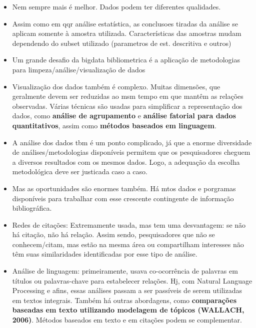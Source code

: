 \documentclass[11pt]{article}
\begin{document}
\begin{itemize}
\item Nem sempre mais é melhor. Dados podem ter diferentes qualidades.

\item Assim como em qqr análise estatística, as conclusoes tiradas da análise se aplicam somente à amostra utilizada. Características das amostras mudam dependendo do subset utilizado (parametros de est. descritiva e outros)

\item Um grande desafio da bigdata bibliometrica é a aplicação de metodologias para limpeza/análise/visualização de dados

\item Visualização dos dados também é complexo. Muitas dimensões, que geralmente devem ser reduzidas ao msm tempo em que mantêm as relações observadas. Várias técnicas são usadas para simplificar a representação dos dados, como \textbf{análise de agrupamento} e \textbf{análise fatorial para dados quantitativos}, assim como \textbf{métodos baseados em linguagem}.

\item A análise dos dados tbm é um ponto complicado, já que a enorme diversidade de análises/metodologias disponíveis permitem que os pesquisadores cheguem a diversos resultados com os mesmos dados. Logo, a adequação da escolha metodológica deve ser justicada caso a caso.

\item Mas as oportunidades são enormes também. Há mtos dados e porgramas disponíveis para trabalhar com esse crescente contingente de informação bibliográfica.

\item Redes de citações: Extremamente usada, mas tem uma desvantagem: se não há citação, não há relação. Assim sendo, pesquisadores que não se conhecem/citam, mas estão na mesma área ou compartilham interesses não têm suas similaridades identificadas por esse tipo de análise.

\item Análise de linguagem: primeiramente, usava co-ocorrência de palavras em títulos ou palavras-chave para estabelecer relações. Hj, com Natural Language Processing e afins, essas análises passam a ser passíveis de serem utilizadas em textos integrais. Também há outras abordagens, como \textbf{comparações baseadas em texto utilizando modelagem de tópicos (WALLACH, 2006)}. Métodos baseados em texto e em citações podem se complementar.
\end{itemize}
\end{document}
